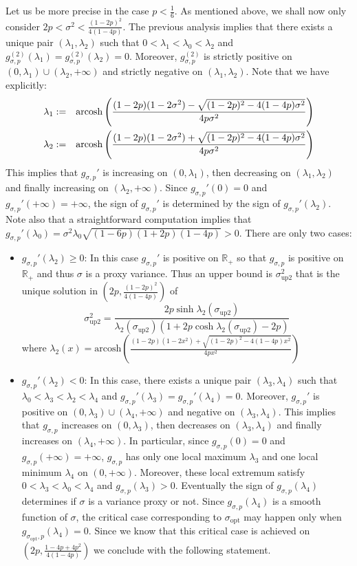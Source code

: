 \documentclass[a4paper, 10pt]{article}
\newcommand{\arcosh}{\text{arcosh}}
\newcommand{\beq}{\begin{equation}}
\newcommand{\eeq}{\end{equation}}
\newcommand{\bea}{\begin{eqnarray}}
\newcommand{\eea}{\end{eqnarray}}
\theoremstyle{definition}
\begin{document}
Let us be more precise in the case $p<\frac{1}{6}$. As mentioned above, we shall now only consider $2p<\sigma^2<\frac{(1-2p)^2}{4(1-4p)}$. The previous analysis implies that there exists a unique pair $(\lambda_1,\lambda_2)$ such that $0<\lambda_1<\lambda_0<\lambda_2$ and $g_{\sigma,p}^{(2)}(\lambda_1)=g_{\sigma,p}^{(2)}(\lambda_2)=0$. Moreover, $g_{\sigma,p}^{(2)}$ is strictly positive on $(0,\lambda_1)\cup(\lambda_2,+\infty)$ and strictly negative on $(\lambda_1,\lambda_2)$. 
Note that we have explicitly:
\bea \lambda_1&:=&\arcosh\left(  \frac{(1-2p)(1-2\sigma^2)-\sqrt{(1-2p)^2-4(1-4p)\sigma^2 } }{4p\sigma^2}\right)\cr
\lambda_2&:=&\arcosh\left(  \frac{(1-2p)(1-2\sigma^2)+\sqrt{(1-2p)^2-4(1-4p)\sigma^2 } }{4p\sigma^2}\right)
\eea
This implies that $g_{\sigma,p}'$ is increasing on $(0,\lambda_1)$, then decreasing on $(\lambda_1,\lambda_2)$ and finally increasing on $(\lambda_2,+\infty)$. Since $g_{\sigma,p}'(0)=0$ and $g_{\sigma,p}'(+\infty)=+\infty$, the sign of $g_{\sigma,p}'$ is determined by the sign of $g_{\sigma,p}'(\lambda_2)$. Note also that a straightforward computation implies that $g_{\sigma,p}'(\lambda_0)=\sigma^2 \lambda_0\sqrt{(1-6p)(1+2p)(1-4p)}>0$. There are only two cases:
\begin{itemize}
\item $g_{\sigma,p}'(\lambda_2)\geq 0$: In this case $g_{\sigma,p}'$ is positive on $\mathbb{R}_+$ so that $g_{\sigma,p}$ is positive on $\mathbb{R}_+$ and thus $\sigma$ is a proxy variance. Thus an upper bound is $\sigma^2_{\text{up2}}$ that is the unique solution in $\left(2p,\frac{(1-2p)^2}{4(1-4p)}\right)$ of 
\beq \sigma^2_{\text{up2}}=\frac{2p\sinh\lambda_2(\sigma_{\text{up2}})}{\lambda_2(\sigma_{\text{up2}}) (1+2p\cosh \lambda_2(\sigma_{\text{up2}})-2p) }\eeq
where $\lambda_2(x)=\arcosh\left(  \frac{(1-2p)(1-2x^2)+\sqrt{(1-2p)^2-4(1-4p)x^2 } }{4px^2}\right)$
\item $g_{\sigma,p}'(\lambda_2)<0$: In this case, there exists a unique pair $(\lambda_3,\lambda_4)$ such that $\lambda_0<\lambda_3<\lambda_2<\lambda_4$ and $g_{\sigma,p}'(\lambda_3)=g_{\sigma,p}'(\lambda_4)=0$. Moreover, $g_{\sigma,p}'$ is positive on $(0,\lambda_3)\cup(\lambda_4,+\infty)$ and negative on $(\lambda_3,\lambda_4)$. This implies that $g_{\sigma,p}$ increases on $(0,\lambda_3)$, then decreases on $(\lambda_3,\lambda_4)$ and finally increases on $(\lambda_4,+\infty)$. In particular, since $g_{\sigma,p}(0)=0$ and $g_{\sigma,p}(+\infty)=+\infty$, $g_{\sigma,p}$ has only one local maximum $\lambda_3$ and one local minimum $\lambda_4$ on $(0,+\infty)$. Moreover, these local extremum satisfy $0<\lambda_3<\lambda_0<\lambda_4$ and $g_{\sigma,p}(\lambda_3)>0$. Eventually the sign of $g_{\sigma,p}(\lambda_4)$ determines if $\sigma$ is a variance proxy or not. Since $g_{\sigma,p}(\lambda_4)$ is a smooth function of $\sigma$, the critical case corresponding to $\sigma_{\text{opt}}$ may happen only when $g_{\sigma_{\text{opt}},p}(\lambda_4)=0$. Since we know that this critical case is achieved on $\left(2p,\frac{1-4p+4p^2}{4(1-4p)}\right)$ we conclude with the following statement.
\end{itemize}
\end{document}
